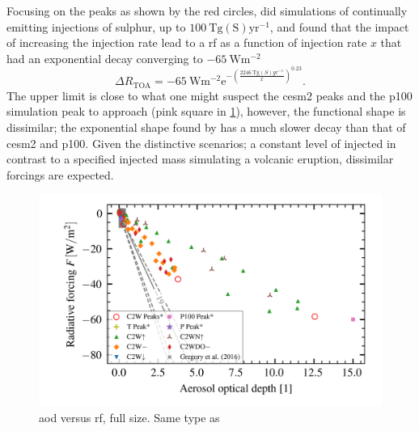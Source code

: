 \documentclass{ametsocV5}
\newcommand{\iso}[1][i]{{#1}njected \ce{SO2}}
\begin{document}
Focusing on the peaks as shown by the red circles, \citet{niemeier2015} did simulations
of continually emitting injections of sulphur, up to \(\SI{100}{\tera\gram
  \mathrm{(S)}\mathrm{yr}^{-1}}\), and found that the impact of increasing the injection
rate lead to a \ac{rf} as a function of injection rate \(x\) that had an exponential
decay converging to \( \SI{-65}{\watt\meter^{-2}} \)
\begin{equation}
  \Delta
  R_{\mathrm{TOA}} =
  -\SI{65}{\watt\metre^{-2}}
  \mathrm{e}^{-{\left(\frac{\SI{2246}{\tera\gram(S)yr^{-1}}}{x}\right)}^{0.23}}.
  \label{eq:niemeier_exponential}
\end{equation}
%
The upper limit is close to what one might suspect the \ac{cesm2} peaks and the
\ac{p100} simulation peak to approach (pink square in \cref{fig:aod_vs_toa_full}),
however, the functional shape is dissimilar; the exponential shape found by
\citet{niemeier2015} has a much slower decay than that of \ac{cesm2} and \ac{p100}.
Given the distinctive scenarios; a constant level of \iso{} in contrast to a specified
injected mass simulating a volcanic eruption, dissimilar forcings are expected.

\begin{figure}[t]
  \begin{center}
    \includegraphics[width=0.95\linewidth]{figures/aod_vs_toa_avg_full.png}
  \end{center}
  \caption{\ac{aod} versus \ac{rf}, full size. Same type as
    \citet{gregory2016}}%
  \label{fig:aod_vs_toa_full}
\end{figure}
\end{document}
